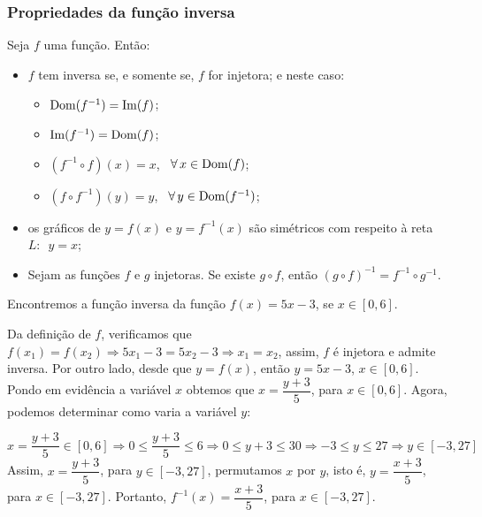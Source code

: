 \documentclass[../main.tex]{subfiles}
\begin{document}
\subsubsection{Propriedades da função inversa}
Seja \(f\) uma função. Então:
\begin{itemize}
    \item \(f\) tem inversa se, e somente se, \(f\) for injetora; e neste caso:
\begin{itemize}
    \item  \({\rm Dom}(f^{-1})={\rm Im}(f)\);

\item \({\rm Im}(f^{-1})={\rm Dom}(f)\);

\item \((f^{-1}\circ f)(x)=x\), \(\,\,\,\forall\,x\in {\rm Dom}(f)\);

\item \((f\circ f^{-1})(y)=y\), \(\,\,\,\forall\,y\in {\rm Dom}(f^{-1})\);
\end{itemize}
\item os gráficos de \(y=f(x)\) e \(y=f^{-1}(x)\) são simétricos com respeito à reta \(L:\,\,\,y=x\); 
\item Sejam as funções \(f\) e \(g\) injetoras. Se existe \(g\circ f\), então \((g\circ f)^{-1}= f^{-1}\circ g^{-1}\).
\end{itemize}
\begin{ex}
Encontremos a função inversa da função \( f(x)=5x-3\), se \(x\in[0,6]\).\\
\begin{solution}
Da definição de \(f\), verificamos que $f(x_1)=f(x_2)\Rightarrow 5x_1-3=5x_2-3 \Rightarrow x_1=x_2$, assim, \(f\) é injetora e admite inversa. Por outro lado, desde que \(y=f(x)\), então \(y=5x-3\), \(x\in [0,6]\). Pondo em evidência a variável \(x\) obtemos que \(x=\dfrac{y+3}{5}\), para \(x\in [0,6]\). Agora, podemos determinar como varia a variável \(y\):

\[ x=\dfrac{y+3}{5}\in [0,6] \Rightarrow 0\leq \dfrac{y+3}{5} \leq 6 \Rightarrow 0\leq y +3 \leq 30 \Rightarrow -3\leq y \leq 27 \Rightarrow y\in[-3,27] \]
Assim, \(x=\dfrac{y+3}{5}\), para \(y\in [-3,27]\), permutamos \(x\) por \(y\), isto é, \(y=\dfrac{x+3}{5}\), para \(x\in [-3,27]\). Portanto, \(f^{-1}(x)=\dfrac{x+3}{5}\), para \(x\in [-3,27]\).
\end{solution}
\end{ex}
\end{document}
